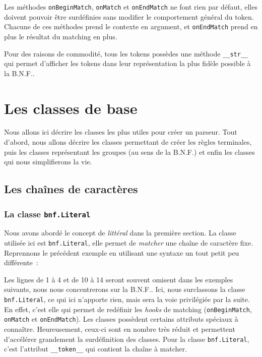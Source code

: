 \documentclass[a4paper]{article}
\newcommand{\insertpython}[1]{%
{\ttfamily}%
}
\newcommand{\fixed}[1]{\texttt{#1}}
\newcommand{\bnf}{B.N.F.}
\begin{document}
            \noindent
            Les méthodes \fixed{onBeginMatch}, \fixed{onMatch} et
            \fixed{onEndMatch} ne font rien par défaut, elles doivent pouvoir être
            surdéfinies sans modifier le comportement général du token. Chacune
            de ces méthodes prend le contexte en argument, et \fixed{onEndMatch}
            prend en plus le résultat du matching en plus.

            Pour des raisons de commodité, tous les tokens possèdes une méthode
            \fixed{\_\_str\_\_} qui permet d'afficher les tokens dans leur
            représentation la plus fidèle possible à la \bnf.

    \newpage
    \section{Les classes de base}
        Nous allons ici décrire les classes les plus utiles pour créer un parseur.
        Tout d'abord, nous allons décrire les classes permettant de créer les
        règles terminales, puis les classes représentant les groupes (au sens de
        la \bnf) et enfin les classes qui nous simplifierons la vie.

        \subsection{Les chaînes de caractères}

            \subsubsection{La classe \fixed{bnf.Literal}}
                Nous avons abordé le concept de \emph{littéral} dans la première
                section. La classe utilisée ici est \fixed{bnf.Literal}, elle permet
                de \emph{matcher} une chaîne de caractère fixe. Reprennons le précédent
                exemple en utilisant une syntaxe un tout petit peu différente~:
                \insertpython{listings/bnf/ex02.py}
                Les lignes de 1 à 4 et de 10 à 14 seront souvent omisent dans les exemples suivants,
                nous nous concentrerons sur la \bnf. Ici, nous surclassons la
                classe \fixed{bnf.Literal}, ce qui ici n'apporte rien, mais sera
                la voie privilégiée par la suite. En effet, c'est elle
                qui permet de redéfinir les \emph{hooks} de matching
                (\fixed{onBeginMatch}, \fixed{onMatch} et \fixed{onEndMatch}).
                Les classes possèdent certains attributs spéciaux à connaître.
                Heureusement, ceux-ci sont en nombre très réduit et permettent
                d'accélérer grandement la surdéfinition des classes. Pour la classe
                \fixed{bnf.Literal}, c'est l'attribut \fixed{\_\_token\_\_} qui
                contient la chaîne à matcher.
\end{document}
